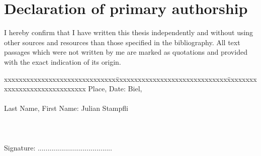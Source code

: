 \chapter*{Declaration of primary authorship}
\label{chap:declaration_authorship}

\vspace*{10mm} 

I hereby confirm that I have written this thesis independently and without using other sources and resources than those specified in the bibliography. All text passages which were not written by me are marked as quotations and provided with the exact indication of its origin. 

\vspace{15mm}

\begin{tabbing}
xxxxxxxxxxxxxxxxxxxxxxxxxxxxxx\=xxxxxxxxxxxxxxxxxxxxxxxxxxxxxx\=xxxxxxxxxxxxxxxxxxxxxxxxxxxxxx\kill
Place, Date:		\> Biel, \versiondate \\ \\ 
Last Name, First Name:	\> Julian Stampfli \\ \\ \\ \\ 
Signature:	\> ......................................\\
\end{tabbing}
